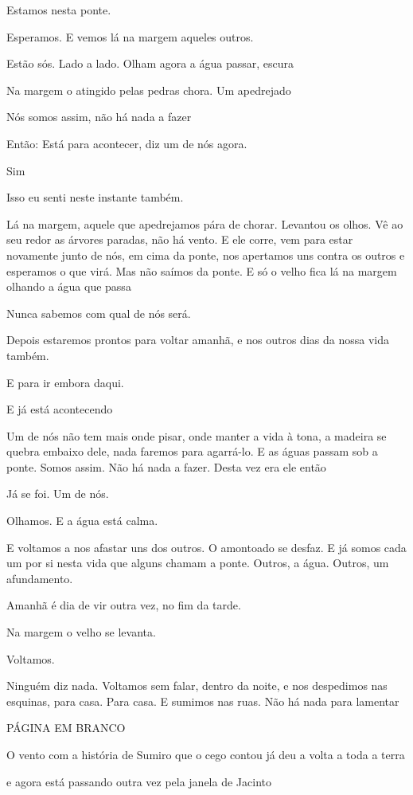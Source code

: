 Estamos nesta ponte.

Esperamos. E vemos lá na margem aqueles outros.

Estão sós. Lado a lado. Olham agora a água passar, escura

Na margem o atingido pelas pedras chora. Um apedrejado

Nós somos assim, não há nada a fazer

Então: Está para acontecer, diz um de nós agora.

Sim

Isso eu senti neste instante também.

Lá na margem, aquele que apedrejamos pára de chorar. Levantou os olhos.
Vê ao seu redor as árvores paradas, não há vento. E ele corre, vem para
estar novamente junto de nós, em cima da ponte, nos apertamos uns contra
os outros e esperamos o que virá. Mas não saímos da ponte. E só o velho
fica lá na margem olhando a água que passa

Nunca sabemos com qual de nós será.

Depois estaremos prontos para voltar amanhã, e nos outros dias da nossa
vida também.

E para ir embora daqui.

E já está acontecendo

Um de nós não tem mais onde pisar, onde manter a vida à tona, a madeira
se quebra embaixo dele, nada faremos para agarrá-lo. E as águas passam
sob a ponte. Somos assim. Não há nada a fazer. Desta vez era ele então

Já se foi. Um de nós.

Olhamos. E a água está calma.

E voltamos a nos afastar uns dos outros. O amontoado se desfaz. E já
somos cada um por si nesta vida que alguns chamam a ponte. Outros, a
água. Outros, um afundamento.

Amanhã é dia de vir outra vez, no fim da tarde.

Na margem o velho se levanta.

Voltamos.

Ninguém diz nada. Voltamos sem falar, dentro da noite, e nos despedimos
nas esquinas, para casa. Para casa. E sumimos nas ruas. Não há nada para
lamentar

PÁGINA EM BRANCO

O vento com a história de Sumiro que o cego contou já deu a volta a toda
a terra

e agora está passando outra vez pela janela de Jacinto

